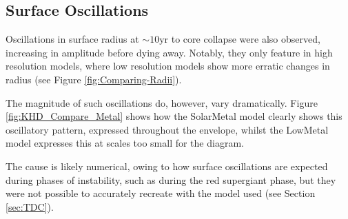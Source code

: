 \subsection{Surface Oscillations}

Oscillations in surface radius at $\sim 10 \mathrm{yr}$ to core collapse were also observed, increasing in amplitude before dying away. Notably, they only feature in high resolution models, where low resolution models show more erratic changes in radius (see Figure \ref{fig:Comparing-Radii}). 



The magnitude of such oscillations do, however, vary dramatically. Figure \ref{fig:KHD_Compare_Metal} shows how the \gls{SolarMetal} model clearly shows this oscillatory pattern, expressed throughout the envelope, whilst the \gls{LowMetal} model expresses this at scales too small for the diagram. 

The cause is likely numerical, owing to how surface oscillations are expected during phases of instability, such as during the red supergiant phase, but they were not possible to accurately recreate with the model used (see Section \ref{sec:TDC}). 


%
